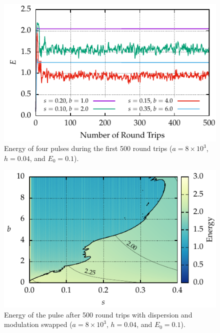 \documentclass[9pt,twocolumn,twoside]{osajnl}
\begin{document}
\begin{figure}[tbp]
	\centering
	\includegraphics{Figures/EnergyTime}
	\caption{Energy of four pulses during the first 500 round trips ($a = 8 \times 10^3$, $h = 0.04$, and $E_0 = 0.1$).}
	\label{fig:energytime}
\end{figure}

\begin{figure}[tbp]
	\centering
	\includegraphics{Figures/ParamSpaceEnergySwitch}
	\caption{Energy of the pulse after 500 round trips with dispersion and modulation swapped ($a = 8 \times 10^3$, $h = 0.04$, and $E_0 = 0.1$).}
	\label{fig:energyswitch}
\end{figure}
\end{document}
